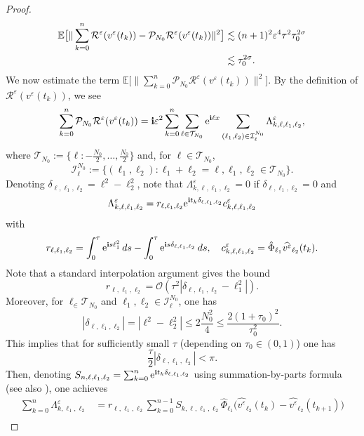 \documentclass[a4paper]{amsart}
\begin{document}
\begin{proof}
\begin{align}
    \mathbb{E}\big[\|\sum_{k=0}^n \mathcal{R}^\varepsilon(v^\varepsilon(t_k))-\mathcal{P}_{N_0}\mathcal{R}^\varepsilon(v^\varepsilon(t_k))\|^2\big]&\lesssim (n+1)^2\varepsilon^4\tau^2 \tau_0^{2\sigma}\notag \\
    &\lesssim  \tau_0^{2\sigma}\label{fe0}.
\end{align}
We now estimate the term $\mathbb{E}\big[\|\sum_{k=0}^n \mathcal{P}_{N_0}\mathcal{R}^\varepsilon(v^\varepsilon(t_k))\|^2\big]$. By the definition of $\mathcal{R}^\varepsilon(v^\varepsilon(t_k))$, we see
$$
\sum_{k=0}^n \mathcal{P}_{N_0}\mathcal{R}^\varepsilon(v^\varepsilon(t_k))={\bf i}\varepsilon^2 \sum_{k=0}^n \displaystyle\sum_{\ell \in \mathcal{T}_{N_0}}{\rm e}^{{\bf i}\ell x}\displaystyle\sum_{(\ell_1,\ell_2)\in\mathcal{I}_\ell^{N_0}} \Lambda^\varepsilon_{k,\ell,\ell_1,\ell_2},
$$
where
$
\mathcal{T}_{N_0}:=\{\ell: -\frac{N_0}{2},\dots,\frac{N_0}{2}\}
$
and, for $\ell \in \mathcal{T}_{N_0}$, 
$$
\mathcal{I}_\ell^{N_0}:=\{(\ell_1,\ell_2): \ell_1+\ell_2=\ell, \ell_1,\ell_2\in \mathcal{T}_{N_0}\}.
$$
Denoting $\delta_{\ell,\ell_1,\ell_2}=\ell^2-\ell_2^2$, note that $\Lambda^\varepsilon_{k,\ell,\ell_1,\ell_2}=0$ if $\delta_{\ell,\ell_1,\ell_2}=0$ and 
$$
\Lambda^\varepsilon_{k,\ell,\ell_1,\ell_2}=r_{\ell,\ell_1,\ell_2} {\rm e}^{{\bf i}t_k\delta_{\ell,\ell_1,\ell_2}} c^\varepsilon_{k,\ell,\ell_1,\ell_2}
$$
with
$$
r_{\ell,\ell_1,\ell_2}=\int_0^\tau {\rm e}^{{\bf i}s \ell_1^2}\,ds-\int_0^\tau {\rm e}^{{\bf i}s \delta_{\ell,\ell_1,\ell_2}}\,ds, \quad c^\varepsilon_{k,\ell,\ell_1,\ell_2}
=\hat{\Phi}_{\ell_1} \widehat{v^\varepsilon}_{\ell_2}(t_k).
$$
Note that a standard interpolation argument gives the bound
$$
r_{\ell,\ell_1,\ell_2}=\mathcal{O}(\tau^2 |\delta_{\ell,\ell_1,\ell_2}-\ell_1^2|).
$$
Moreover, for $\ell_\in \mathcal{T}_{N_0}$ and $\ell_1,\ell_2 \in \mathcal{I}_{\ell}^{N_0}$, one has
$$
|\delta_{\ell,\ell_1,\ell_2}|=|\ell^2-\ell_2^2|\le 2 \frac{N_0^2}{4}\le \frac{2(1+\tau_0)^2}{\tau_0^2}.
$$
This implies that for sufficiently small $\tau$ (depending on $\tau_0 \in (0,1)$) one has 
$$
\frac{\tau}{2}|\delta_{\ell,\ell_1,\ell_2}|<\pi.
$$
Then, denoting $S_{n,\ell,\ell_1,\ell_2}=\sum_{k=0}^n {\rm e}^{{\bf i}t_k\delta_{\ell,\ell_1,\ell_2}}$ using summation-by-parts formula (see also \cite{fe_ka}), one achieves
\begin{align*}
\sum_{k=0}^{n}\Lambda^\varepsilon_{k,\ell_1,\ell_2}&=r_{\ell,\ell_1,\ell_2}\sum_{k=0}^{n-1}S_{k,\ell,\ell_1,\ell_2}\hat{\Phi}_{\ell_1}\big(\widehat{v^\varepsilon}_{\ell_2}(t_k)-\widehat{v^\varepsilon}_{\ell_2}(t_{k+1})\big)\\

\end{align*}
\end{proof}
\end{document}

